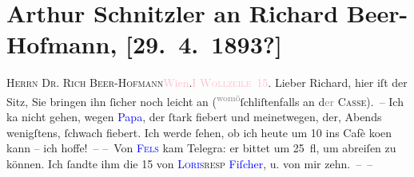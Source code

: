 

               \section[Arthur Schnitzler an Richard Beer-Hofmann, {[}29. 4. 1893?{]}]{ Arthur Schnitzler an Richard Beer-Hofmann, {[}29. 4. 1893?{]}}\nopagebreak{}\rehead{ }\normalsize\beginnumbering{} \toendnotes[C]{\smallbreak\pagebreak[2]} 
\toendnotes[C]{\smallbreak}\pstart{}{\pb}\textsc{Herrn Dr. Rich Beer-Hofmann}\pend{}\pstart{}\textcolor{pink}{Wien}{}\ledrightnote{\textcolor{pink}{Wien}}.\pend{}\pstart{}\textsc{\textcolor{pink}{I Wollzeile 15}{}\ledrightnote{\textcolor{pink}{Wollzeile}}}.\pend{}{\bigskip}\pstart
           \noindent{}{\pb}Lieber Richard, hier iſt der Sitz,
               Sie bringen ihn ſicher noch leicht an \introOben{}(\substVorne{}\textsuperscript{\textcolor{gray}{womö}}\substDazwischen{}ſchli{\geminationm}\substHinten{}ſtenfalls an d\textcolor{gray}{er}{ }\textsc{Casse})\introOben{}. – Ich ka{\geminationn}
               nicht gehen, wegen \textcolor{blue}{Papa}{}, der
               ſtark fiebert und meinetwegen, der, Abends wenigſtens, ſchwach fiebert. Ich werde
               ſehen, ob ich heute um 10 ins Cafè {\pb}ko{\geminationm}en kann – ich hoffe! –\pend
           \pstart
           – Von \textcolor{blue}{\textsc{Fels}}{}\ledrightnote{\textcolor{blue}{Friedrich Michael Fels}} kam Telegra{\geminationm}: er bittet um 25 fl, um abreiſen zu
               können. Ich ſandte ihm die 15 von \textcolor{blue}{\textsc{Loris}}{}\ledrightnote{\textcolor{blue}{Hugo von Hofmannsthal}}{ }\textsc{resp}{ }\textcolor{blue}{Fiſcher}{}\ledrightnote{\textcolor{blue}{Robert Fischer}}, u. von mir zehn. – –\pend
           \pstart
